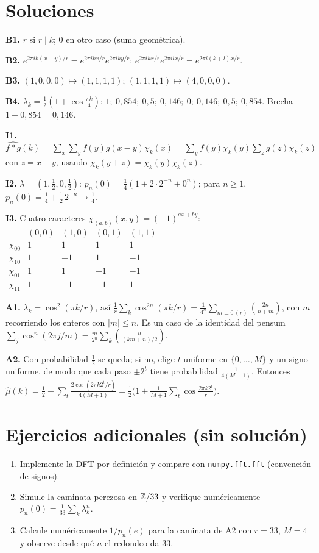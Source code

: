 \documentclass[11pt,a4paper]{article}
\begin{document}
\section{Soluciones}
\begin{solucion}
\textbf{B1.} $r$ si $r\mid k$; $0$ en otro caso (suma geométrica).

\textbf{B2.} $e^{2\pi ik(x+y)/r}=e^{2\pi ikx/r}e^{2\pi iky/r}$; $e^{2\pi ikx/r}e^{2\pi ilx/r}=e^{2\pi i(k+l)x/r}$.

\textbf{B3.} $(1,0,0,0)\mapsto(1,1,1,1)$; $(1,1,1,1)\mapsto(4,0,0,0)$.

\textbf{B4.} $\lambda_k=\frac12(1+\cos\frac{\pi k}{4})$: $1;\ 0{,}854;\ 0{,}5;\ 0{,}146;\ 0;\ 0{,}146;\ 0{,}5;\ 0{,}854$. Brecha $1-0{,}854=0{,}146$.

\textbf{I1.} $\widehat{f*g}(k)=\sum_x\sum_yf(y)g(x-y)\overline{\chi_k(x)}=\sum_yf(y)\overline{\chi_k(y)}\sum_zg(z)\overline{\chi_k(z)}$ con $z=x-y$, usando $\chi_k(y+z)=\chi_k(y)\chi_k(z)$.

\textbf{I2.} $\lambda=(1,\frac12,0,\frac12)$: $p_n(0)=\frac14(1+2\cdot2^{-n}+0^n)$; para $n\ge1$, $p_n(0)=\frac14+\frac12\,2^{-n}\to\frac14$.

\textbf{I3.} Cuatro caracteres $\chi_{(a,b)}(x,y)=(-1)^{ax+by}$:
$\begin{array}{c|cccc}&(0,0)&(1,0)&(0,1)&(1,1)\\\hline\chi_{00}&1&1&1&1\\\chi_{10}&1&-1&1&-1\\\chi_{01}&1&1&-1&-1\\\chi_{11}&1&-1&-1&1\end{array}$

\textbf{A1.} $\lambda_k=\cos^2(\pi k/r)$, así $\frac1r\sum_k\cos^{2n}(\pi k/r)=\frac1{4^n}\sum_{m\equiv0\,(r)}\binom{2n}{n+m}$, con $m$ recorriendo los enteros con $|m|\le n$. Es un caso de la identidad del pensum $\sum_j\cos^n(2\pi j/m)=\frac m{2^n}\sum_k\binom{n}{(km+n)/2}$.

\textbf{A2.} Con probabilidad $\frac12$ se queda; si no, elige $t$ uniforme en $\{0,\dots,M\}$ y un signo uniforme, de modo que cada paso $\pm2^t$ tiene probabilidad $\frac1{4(M+1)}$. Entonces $\hat\mu(k)=\frac12+\sum_t\frac{2\cos(2\pi k2^t/r)}{4(M+1)}=\frac12\big(1+\frac1{M+1}\sum_t\cos\frac{2\pi k2^t}{r}\big)$.
\end{solucion}

\section{Ejercicios adicionales (sin solución)}
\begin{enumerate}[label=\textbf{P\arabic*.}]
\item Implemente la DFT por definición y compare con \texttt{numpy.fft.fft} (convención de signos).
\item Simule la caminata perezosa en $\mathbb{Z}/33$ y verifique numéricamente $p_n(0)=\frac1{33}\sum_k\lambda_k^n$.
\item Calcule numéricamente $1/p_n(e)$ para la caminata de A2 con $r=33$, $M=4$ y observe desde qué $n$ el redondeo da 33.
\end{enumerate}
\end{document}
